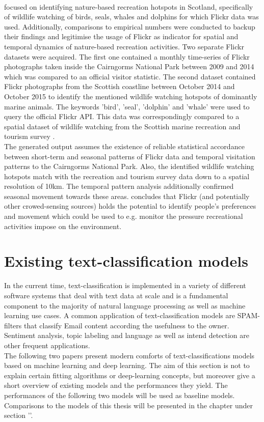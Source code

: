 \paragraph*{\textcite{Mancini2018}} focused on identifying nature-based recreation hotspots in Scotland, specifically of wildlife watching of birds, seals, whales and dolphins for which Flickr data was used. Additionally, comparisons to empirical numbers were conducted to backup their findings and legitimise the usage of Flickr as indicator for spatial and temporal dynamics of nature-based recreation activities.
Two separate Flickr datasets were acquired. The first one contained a monthly time-series of Flickr photographs taken inside the Cairngorms National Park between 2009 and 2014 which was compared to an official visitor statistic. The second dataset contained Flickr photographs from the Scottish coastline between October 2014 and October 2015 to identify the mentioned wildlife watching hotspots of dominantly marine animals. The keywords 'bird', 'seal', 'dolphin' and 'whale' were used to query the official Flickr API. This data was correspondingly compared to a spatial dataset of wildlife watching from the Scottish marine recreation and tourism survey \parencite{LUC2016}. \\
The generated output assumes the existence of reliable statistical accordance between short-term and seasonal patterns of Flickr data and temporal visitation patterns to the Cairngorms National Park.  
Also, the identified wildlife watching hotspots match with the recreation and tourism survey data down to a spatial resolution of 10km. The temporal pattern analysis additionally confirmed seasonal movement towards these areas. \textcite{Mancini2018} concludes that Flickr (and potentially other crowed-sensing sources) holds the potential to identify people's preferences and movement which could be used to e.g. monitor the pressure recreational activities impose on the environment.

\section{Existing text-classification models}
In the current time, text-classification is implemented in a variety of different software systems that deal with text data at scale and is a fundamental component to the majority of natural language processing as well as machine learning use cases. A common application of text-classification models are SPAM-filters that classify Email content according the usefulness to the owner. Sentiment analysis, topic labeling and language as well as intend detection are other frequent applications.\\
The following two papers present modern comforts of text-classifications models based on machine learning and deep learning. The aim of this section is not to explain certain fitting algorithms or deep-learning concepts, but moreover give a short overview of existing models and the performances they yield. The performances of the following two models will be used as baseline models. Comparisons to the models of this thesis will be presented in the  chapter under section ''. 

